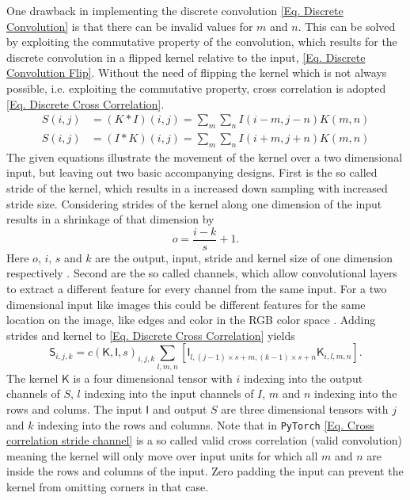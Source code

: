 One drawback in implementing the discrete convolution \cref{Eq. Discrete Convolution} is that there can be invalid values for \(m\) and \(n\). This can be solved by exploiting the commutative property of the convolution, which results for the discrete convolution in a flipped kernel relative to the input, \cref{Eq. Discrete Convolution Flip}. Without the need of flipping the kernel which is not always possible, i.e. exploiting the commutative property, cross correlation is adopted \cref{Eq. Discrete Cross Correlation}.
\begin{align}
	S(i,j) &= (K * I)(i,j) = \sum_{m}\sum_{n}I(i-m,j-n)K(m,n) 
	\label{Eq. Discrete Convolution Flip}\\
	S(i,j) &= (I * K)(i,j) = \sum_{m}\sum_{n}I(i+m,j+n)K(m,n) 
	\label{Eq. Discrete Cross Correlation}
\end{align}
The given equations illustrate the movement of the kernel over a two dimensional input, but leaving out two basic accompanying designs. First is the so called stride of the kernel, which results in a increased down sampling with increased stride size. Considering strides of the kernel along one dimension of the input results in a shrinkage of that dimension by 
\begin{equation}\label{Eq:Downsampling}
	o = \frac{i -k}{s} + 1.
\end{equation} 
Here \(o\), \(i\), \(s\) and \(k\) are the output, input, stride and kernel size of one dimension respectively \cite{dumoulin2018guide}. Second are the so called channels, which allow convolutional layers to extract a different feature for every channel from the same input. For a two dimensional input like images this could be different features for the same location on the image, like edges and color in the RGB color space \cite{Goodfellow}. Adding strides and kernel to \cref{Eq. Discrete Cross Correlation} yields
\begin{equation}
	\mathsf{S}_{i,j,k} = c(\mathsf{K},\mathsf{I},s)_{i,j,k}\sum_{l,m,n}\left[\mathsf{I}_{l,(j-1)\times s+m,(k -1)\times s+n}\mathsf{K}_{i,l,m,n}\right]. \label{Eq. Cross correlation stride channel}
\end{equation}
The kernel \(\mathsf{K}\) is a four dimensional tensor with \(i\) indexing into the output channels of \(S\), \(l\) indexing into the input channels of \(I\), \(m\) and \(n\) indexing into the rows and colums. The input \(\mathsf{I}\) and output \(S\) are three dimensional tensors with \(j\) and \(k\) indexing into the rows and columns. Note that in \texttt{PyTorch} \cref{Eq. Cross correlation stride channel} is a so called valid cross correlation (valid convolution) \cite{bibid} meaning the kernel will only move over input units for which  all \(m\) and \(n\) are inside the rows and columns of the input. Zero padding the input can prevent the kernel from omitting corners in that case.
